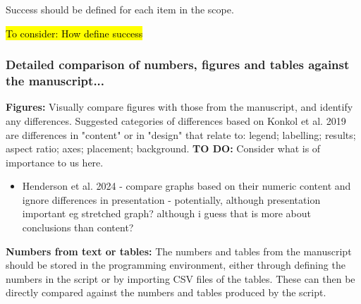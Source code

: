Success should be defined for each item in the scope.


\hl{To consider: How define success}

\subsubsection{Detailed comparison of numbers, figures and tables against the manuscript...}

\textbf{Figures:} Visually compare figures with those from the manuscript, and identify any differences. Suggested categories of differences based on Konkol et al. 2019\autocite{konkol_computational_2019} are differences in "content" or in "design" that relate to: legend; labelling; results; aspect ratio; axes; placement; background.\autocite{konkol_computational_2019} \textbf{TO DO:} Consider what is of importance to us here.

\begin{itemize}
    \item Henderson et al. 2024 - compare graphs based on their numeric content and ignore differences in presentation\autocite{mcmanus_can_2019} - potentially, although presentation important eg stretched graph? although i guess that is more about conclusions than content?
\end{itemize}

\textbf{Numbers from text or tables:} The numbers and tables from the manuscript should be stored in the programming environment, either through defining the numbers in the script or by importing CSV files of the tables. These can then be directly compared against the numbers and tables produced by the script.

